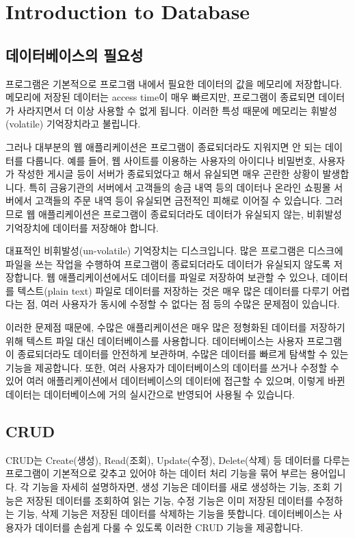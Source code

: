 \section{Introduction to Database}\label{sect:intro-to-database}

\subsection*{데이터베이스의 필요성}

프로그램은 기본적으로 프로그램 내에서 필요한 데이터의 값을 메모리에 저장합니다. 메모리에 저장된 데이터는 access time이 매우 빠르지만, 프로그램이 종료되면 데이터가 사라지면서 더 이상 사용할 수 없게 됩니다. 이러한 특성 때문에 메모리는 휘발성(volatile) 기억장치라고 불립니다.

그러나 대부분의 웹 애플리케이션은 프로그램이 종료되더라도 지워지면 안 되는 데이터를 다룹니다. 예를 들어, 웹 사이트를 이용하는 사용자의 아이디나 비밀번호, 사용자가 작성한 게시글 등이 서버가 종료되었다고 해서 유실되면 매우 곤란한 상황이 발생합니다. 특히 금융기관의 서버에서 고객들의 송금 내역 등의 데이터나 온라인 쇼핑몰 서버에서 고객들의 주문 내역 등이 유실되면 금전적인 피해로 이어질 수 있습니다. 그러므로 웹 애플리케이션은 프로그램이 종료되더라도 데이터가 유실되지 않는, 비휘발성 기억장치에 데이터를 저장해야 합니다.

대표적인 비휘발성(un-volatile) 기억장치는 디스크입니다. 많은 프로그램은 디스크에 파일을 쓰는 작업을 수행하여 프로그램이 종료되더라도 데이터가 유실되지 않도록 저장합니다. 웹 애플리케이션에서도 데이터를 파일로 저장하여 보관할 수 있으나, 데이터를 텍스트(plain text) 파일로 데이터를 저장하는 것은 매우 많은 데이터를 다루기 어렵다는 점, 여러 사용자가 동시에 수정할 수 없다는 점 등의 수많은 문제점이 있습니다.

이러한 문제점 때문에, 수많은 애플리케이션은 매우 많은 정형화된 데이터를 저장하기 위해 텍스트 파일 대신 데이터베이스를 사용합니다. 데이터베이스는 사용자 프로그램이 종료되더라도 데이터를 안전하게 보관하며, 수많은 데이터를 빠르게 탐색할 수 있는 기능을 제공합니다. 또한, 여러 사용자가 데이터베이스의 데이터를 쓰거나 수정할 수 있어 여러 애플리케이션에서 데이터베이스의 데이터에 접근할 수 있으며, 이렇게 바뀐 데이터는 데이터베이스에 거의 실시간으로 반영되어 사용될 수 있습니다.

\subsection*{CRUD}

CRUD는 Create(생성), Read(조회), Update(수정), Delete(삭제) 등 데이터를 다루는 프로그램이 기본적으로 갖추고 있어야 하는 데이터 처리 기능을 묶어 부르는 용어입니다. 각 기능을 자세히 설명하자면, 생성 기능은 데이터를 새로 생성하는 기능, 조회 기능은 저장된 데이터를 조회하여 읽는 기능, 수정 기능은 이미 저장된 데이터를 수정하는 기능, 삭제 기능은 저장된 데이터를 삭제하는 기능을 뜻합니다. 데이터베이스는 사용자가 데이터를 손쉽게 다룰 수 있도록 이러한 CRUD 기능을 제공합니다.

